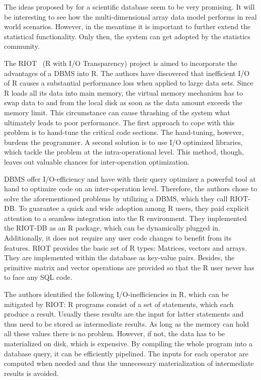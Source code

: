 The ideas proposed by \cite{stonebraker:2009a} for a scientific database seem to be very promising.
It will be interesting to see how the multi-dimensional array data model performs in real world scenarios.
However, in the meantime it is important to further extend the statistical functionality.
Only then, the system can get adopted by the statistics community.

The RIOT~\cite{zhang:apa2009a} (R with I/O Transparency) project is aimed to incorporate the advantages of a DBMS into R.
The authors \cite{zhang:apa2009a} have discovered that inefficient I/O of R causes a substantial performance loss when applied to large data sets.
Since R loads all its data into main memory, the virtual memory mechanism has to swap data to and from the local disk as soon as the data amount exceeds the memory limit.
This circumstance can cause thrashing of the system what ultimately leads to poor performance.
The first approach to cope with this problem is to hand-tune the critical code sections.
The hand-tuning, however, burdens the programmer.
A second solution is to use I/O optimized libraries, which tackle the problem at the intra-operational level.
This method, though, leaves out valuable chances for inter-operation optimization.

DBMS offer I/O-efficiency and have with their query optimizer a powerful tool at hand to optimize code on an inter-operation level.
Therefore, the authors chose to solve the aforementioned problems by utilizing a DBMS, which they call RIOT-DB.
To guarantee a quick and wide adoption among R users, they paid explicit attention to a seamless integration into the R environment.
They implemented the RIOT-DB as an R package, which can be dynamically plugged in.
Additionally, it does not require any user code changes to benefit from its features.
RIOT provides the basic set of R types: Matrices, vectors and arrays.
They are implemented within the database as key-value pairs.
Besides, the primitive matrix and vector operations are provided so that the R user never has to face any SQL code.

The authors identified the following I/O-inefficiencies in R, which can be mitigated by RIOT:
R programs consist of a set of statements, which each produce a result.
Usually these results are the input for latter statements and thus need to be stored as intermediate results.
As long as the memory can hold all these values there is no problem.
However, if not, the data has to be materialized on disk, which is expensive.
By compiling the whole program into a database query, it can be efficiently pipelined.
The inputs for each operator are computed when needed and thus the unnecessary materialization of intermediate results is avoided.

